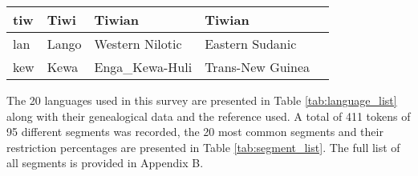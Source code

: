 \begin{table}[h]
{\begin{tabular}{|l|l|l|l|l|}
tiw  & Tiwi                                                          & Tiwian                                                                  & Tiwian               &     \citet{osborneTiwiLanguageGrammar1974}      \\ \hline
lan  & Lango                                                         & Western Nilotic                                                         & Eastern Sudanic      &     \citet{noonanGrammarLango1992}      \\ \hline
kew  & Kewa                                                          & Enga\_Kewa-Huli                                                         & Trans-New Guinea     &     \citet{franklinGrammarKewaNew1971} \\ \hline
\end{tabular}}
\end{table}

The 20 languages used in this survey are presented in Table \ref{tab:language_list} along with their genealogical data and the reference used. 
A total of 411 tokens of 95 different segments was recorded, the 20 most common segments and their restriction percentages are presented in Table \ref{tab:segment_list}. The full list of all segments is provided in Appendix B. 


